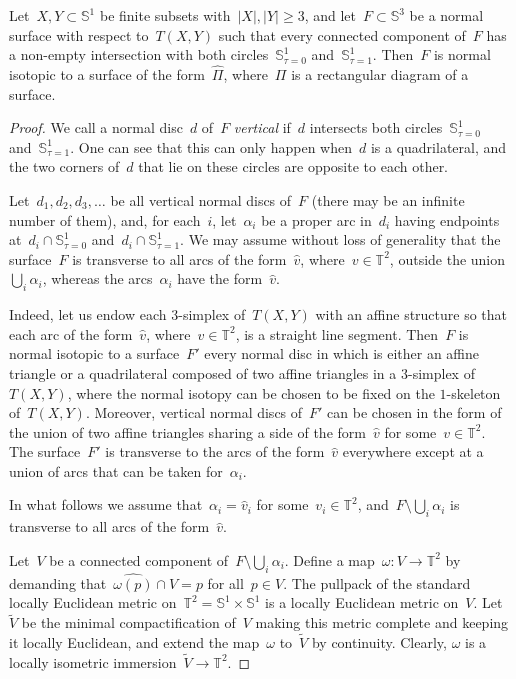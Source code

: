 \documentclass[10pt,a4paper]{amsart}
\begin{document}
\begin{prop}\label{normal=>rect-prop}
Let~$X,Y\subset\mathbb S^1$ be finite subsets with~$|X|,|Y|\geqslant3$, and let~$F\subset\mathbb S^3$
be a normal surface with respect to~$T(X,Y)$ such that every connected component of~$F$
has a non-empty intersection with both circles~$\mathbb S^1_{\tau=0}$ and~$\mathbb S^1_{\tau=1}$. Then~$F$
is normal isotopic to a surface of the form~$\widehat\Pi$, where~$\Pi$ is a rectangular diagram of a surface.
\end{prop}

\begin{proof}
We call a normal disc~$d$ of~$F$ \emph{vertical} if~$d$ intersects both circles~$\mathbb S^1_{\tau=0}$
and~$\mathbb S^1_{\tau=1}$. One can see that this can only happen when~$d$ is a quadrilateral,
and the two corners of~$d$ that lie on these circles are opposite to each other.

Let~$d_1,d_2,d_3,\ldots$ be all vertical normal discs of~$F$ (there may be an infinite number of them), and, for each~$i$,
let~$\alpha_i$ be a proper arc in~$d_i$ having endpoints at~$d_i\cap\mathbb S^1_{\tau=0}$ and~$d_i\cap\mathbb S^1_{\tau=1}$. We may assume without loss of generality that the surface~$F$
is transverse to all arcs of the form~$\widehat v$, where~$v\in\mathbb T^2$, outside the union~$\bigcup_i\alpha_i$,
whereas the arcs~$\alpha_i$ have the form~$\widehat v$.

Indeed, let us endow each $3$-simplex of~$T(X,Y)$ with an affine structure so that each arc of the form~$\widehat v$,
where~$v\in\mathbb T^2$, is a straight line segment. Then~$F$ is normal isotopic to a surface~$F'$ every
normal disc in which is either an affine triangle or a quadrilateral composed of two affine triangles in a $3$-simplex of~$T(X,Y)$,
where the normal isotopy can be chosen to be fixed on the $1$-skeleton of~$T(X,Y)$.
Moreover, vertical normal discs of~$F'$ can be chosen
in the form of the union of two affine triangles sharing a side of the form~$\widehat v$ for some~$v\in\mathbb T^2$.
The surface~$F'$ is transverse to the arcs of the form~$\widehat v$ everywhere except at a union of arcs
that can be taken for~$\alpha_i$.

In what follows we assume that~$\alpha_i=\widehat v_i$ for some~$v_i\in\mathbb T^2$, and~$F\setminus\bigcup_i\alpha_i$
is transverse to all arcs of the form~$\widehat v$.

Let~$V$ be a connected component of~$F\setminus\bigcup_i\alpha_i$. Define a map~$\omega:V\rightarrow\mathbb T^2$
by demanding that~$\widehat{\omega(p)}\cap V=p$ for all~$p\in V$. The pullpack of the standard locally
Euclidean metric on~$\mathbb T^2=\mathbb S^1\times\mathbb S^1$
is a locally Euclidean metric on~$V$. Let~$\widetilde V$ be the minimal compactification of~$V$
making this metric complete and keeping it locally Euclidean, and extend the map~$\omega$ to~$\widetilde V$ by continuity.
Clearly, $\omega$ is a locally isometric immersion~$\widetilde V\rightarrow\mathbb T^2$.


\end{proof}
\end{document}
